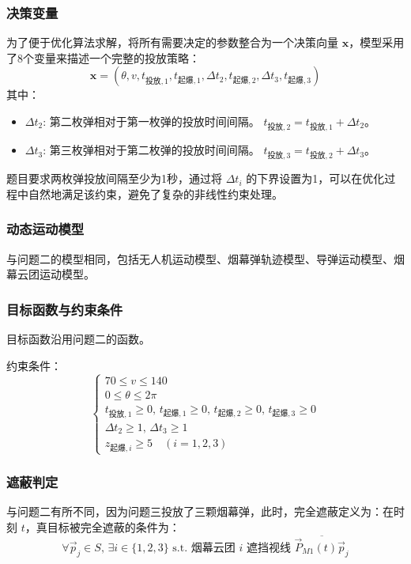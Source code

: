 \documentclass[5pt, withoutpreface,bwprint]{cumcmthesis} %
\begin{document}
\subsubsection{决策变量}
为了便于优化算法求解，将所有需要决定的参数整合为一个决策向量 $\mathbf{x}$，模型采用了8个变量来描述一个完整的投放策略：
\begin{equation}
    \mathbf{x} = (\theta, v, t_{\text{投放},1}, t_{\text{起爆},1}, \Delta t_2, t_{\text{起爆},2}, \Delta t_3, t_{\text{起爆},3})
\end{equation}
其中：
\begin{itemize}
   
    \item $\Delta t_2$: 第二枚弹相对于第一枚弹的投放时间间隔。 $t_{\text{投放},2} = t_{\text{投放},1} + \Delta t_2$。
    \item $\Delta t_3$: 第三枚弹相对于第二枚弹的投放时间间隔。 $t_{\text{投放},3} = t_{\text{投放},2} + \Delta t_3$。
\end{itemize}
题目要求两枚弹投放间隔至少为1秒，通过将 $\Delta t_i$ 的下界设置为1，可以在优化过程中自然地满足该约束，避免了复杂的非线性约束处理。
\subsubsection{动态运动模型}
与问题二的模型相同，包括无人机运动模型、烟幕弹轨迹模型、导弹运动模型、烟幕云团运动模型。
\subsubsection{目标函数与约束条件}
目标函数沿用问题二的函数。
   
   约束条件：\begin{equation}
   \begin{cases}
   70 \leq v \leq 140 \\
   0 \leq \theta \leq 2\pi \\
   t_{\text{投放},1} \geq 0, \, t_{\text{起爆},1} \geq 0, \, t_{\text{起爆},2} \geq 0, \, t_{\text{起爆},3} \geq 0 \\
   \Delta t_2 \geq 1, \, \Delta t_3 \geq 1 \\
   z_{\text{起爆},i} \geq 5 \quad (i=1,2,3)
   \end{cases}
   \end{equation}
     \subsubsection{遮蔽判定}
     与问题二有所不同，因为问题三投放了三颗烟幕弹，此时，完全遮蔽定义为：在时刻 $t$，真目标被完全遮蔽的条件为：
     \begin{equation}
     \forall \vec{p}_j \in S, \, \exists i \in \{1,2,3\} \text{ s.t. 烟幕云团 } i \text{ 遮挡视线 } \overline{\vec{P}_{M1}(t)\vec{p}_j}
     \end{equation}
     
\end{document}
